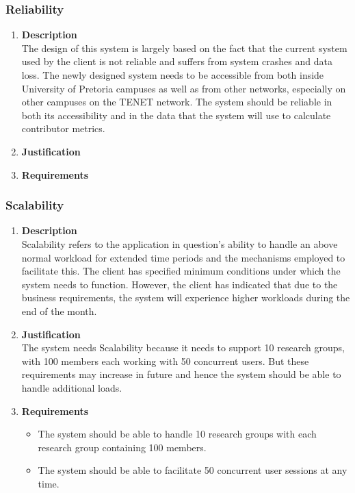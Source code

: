\documentclass[a4paper,10pt]{article}
\begin{document}
	\subsubsection{Reliability}
		\begin{enumerate}
			\item \textbf{Description} \\
				The design of this system is largely based on the fact that the current system used by the client is not reliable and suffers from system crashes and data loss. The newly designed system needs to be accessible from both inside University of Pretoria campuses as well as from other networks, especially on other campuses on the TENET network. The system should be reliable in both its accessibility and in the data that the system will use to calculate contributor metrics. 

			\item \textbf{Justification} \\
			\item \textbf{Requirements}\\
		\end{enumerate}

	\subsubsection{Scalability}
		\begin{enumerate}
			\item \textbf{Description} \\
				Scalability refers to the application in question's ability to handle an above normal workload for extended time periods and the mechanisms employed to facilitate this. The client has specified minimum conditions under which the system needs to function. However, the client has indicated that due to the business requirements, the system will experience higher workloads during the end of the month.

			\item \textbf{Justification} \\
				The system needs Scalability because it needs to support 10 research groups, with 100 members each working with 50 concurrent users. But these requirements may increase in future and hence the system should be able to handle additional loads.

			\item \textbf{Requirements}\\
				\begin{itemize}
					\item The system should be able to handle 10 research groups with each research group containing 100 members.
					\item The system should be able to facilitate 50 concurrent user sessions at any time.
				\end{itemize}
		\end{enumerate}
\end{document}
